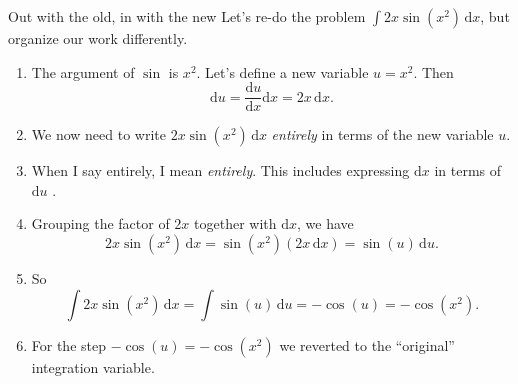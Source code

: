 \documentclass[fleqn]{beamer}
\theoremstyle{definition}
\newenvironment{checklist}{
  \begin{enumerate}[\ding{51}]
    \addtolength{\itemsep}{-0.0\itemsep}}
  {\end{enumerate}}
\begin{document}
\begin{frame}{Out with the old, in with the new}
Let's re-do the problem  \(\int 2 x  \sin(x^2) \, \mathrm{d} x \), but organize our work differently.

\begin{checklist}
\item  The argument of \(\sin\) is \(x^2\).  Let's define a new variable \(u = x^2\).   Then
\[
    \mathrm{d} u = \frac{\mathrm{d} u}{\mathrm{d} x} \mathrm{d} x = 2 x  \, \mathrm{d} x.
\]

\item  We now need to write \(  2 x  \sin(x^2) \, \mathrm{d} x  \)  \emph{entirely} in terms of the new variable \(u\).  

\item When I say entirely, I mean \emph{entirely}. This includes expressing \(\mathrm{d} x \) in terms of  \(\mathrm{d} u \) .

\item Grouping the factor of \(2 x\) together with \(\mathrm{d} x\), we have 
\[
   2 x  \sin(x^2) \, \mathrm{d} x   = \sin(x^2)     (2 x \,  \mathrm{d} x  ) = \sin(u) \, \mathrm{d} u.
\]
\item So
\[
   \int 2 x  \sin(x^2) \, \mathrm{d} x   = \int  \sin(u) \, \mathrm{d} u = -\cos(u) = -\cos(x^2).
\]
\item For the step   \(-\cos(u) = -\cos(x^2) \) we reverted to the ``original'' integration variable.

\end{checklist}

\end{frame}
\end{document}
